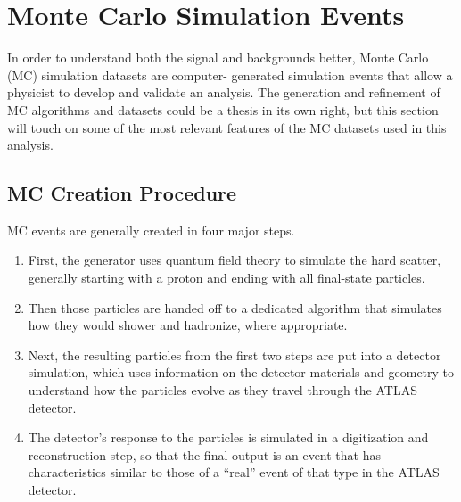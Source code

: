  

\chapter[Monte Carlo Simulation]{Monte Carlo Simulation Events}

In order to understand both the signal and backgrounds better, Monte Carlo (MC) simulation datasets are computer-
generated simulation events that allow a physicist to develop and validate an analysis.  The generation and refinement of MC 
algorithms and datasets could be a thesis in its own right, but this section will touch on some of 
the most relevant features of the MC datasets used in this analysis.


\section{MC Creation Procedure}
\label{sec:mc-gen-overview}
MC events are generally created in four major steps.  
\begin{enumerate}
    \item First, the generator uses quantum field theory to simulate the hard 
    scatter, generally starting with a proton and ending with all final-state particles.  
    \item Then those particles are handed off to a dedicated algorithm that simulates 
    how they would shower and hadronize, where appropriate.  
    \item Next, the resulting particles from the first two steps are put 
    into a detector simulation, which uses information on the detector materials and geometry 
    to understand how the particles evolve as they travel through the ATLAS detector.  
    \item The detector's response to the particles is simulated in a 
    digitization and reconstruction step, so that the final output is an event that 
    has characteristics similar to those of a ``real'' event of that type in the ATLAS detector. 
\end{enumerate} 

